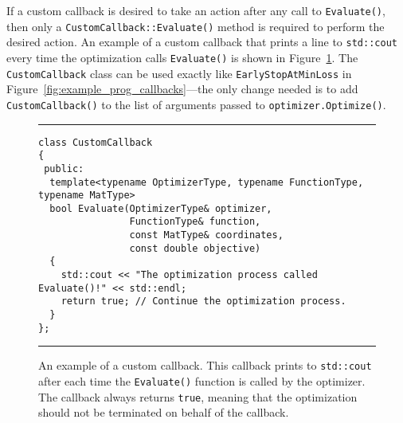 If a custom callback is desired to take an action after any call
to {\tt Evaluate()}, then only a {\tt CustomCallback::Evaluate()} method is required
to perform the desired action.
An example of a custom callback that 
prints a line to {\tt std::cout} every time the optimization calls
{\tt Evaluate()} is shown in Figure~\ref{fig:example_prog_callbacks_2}.
The {\tt CustomCallback} class can be used exactly like {\tt EarlyStopAtMinLoss}
in Figure~\ref{fig:example_prog_callbacks}---the only change
needed is to add {\tt CustomCallback()} to the list of arguments passed to
{\tt optimizer.Optimize()}.


\begin{figure}[!b]
\centering
\hrule
\vspace{1ex}
\begin{verbatim}
class CustomCallback
{
 public:
  template<typename OptimizerType, typename FunctionType, typename MatType>
  bool Evaluate(OptimizerType& optimizer,
                FunctionType& function,
                const MatType& coordinates,
                const double objective)
  {
    std::cout << "The optimization process called Evaluate()!" << std::endl;
    return true; // Continue the optimization process.
  }
};
\end{verbatim}
\hrule
\vspace*{-0.5em}
\caption
  {
  An example of a custom callback.  This callback prints to {\tt std::cout}
after each time the {\tt Evaluate()} function is called by the optimizer.  The
callback always returns {\tt true}, meaning that the optimization should not be
terminated on behalf of the callback.
  }
\label{fig:example_prog_callbacks_2}
\end{figure}


